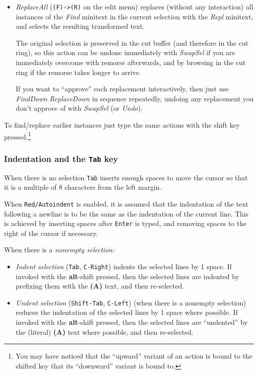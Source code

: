 \documentclass[11pt,a4paper]{article}
\begin{document}
\begin{itemize}
\item
  \emph{ReplaceAll} (\texttt{(F)-\textgreater{}(R)} on the edit menu)
  replaces (without any interaction) all instances of the \emph{Find}
  minitext in the current selection with the \emph{Repl} minitext, and
  selects the resulting transformed text.

  The original selection is preserved in the cut buffer (and therefore
  in the cut ring), so this action can be undone immediately with
  \emph{SwapSel} if you are immediately overcome with remorse
  afterwards, and by browsing in the cut ring if the remorse takes
  longer to arrive.

  If you want to ``approve'' each replacement interactively, then just
  use \emph{FindDown} \emph{ReplaceDown} in sequence repeatedly, undoing
  any replacement you don't approve of with \emph{SwapSel} (or
  \emph{Undo}).
\end{itemize}

To find/replace earlier instances just type the same actions with
the shift key pressed.\footnote{You may have noticed that the
``upward'' variant of an action is bound to the shifted key that
its ``downward'' variant is bound to.}






\hypertarget{indentation}{%
\subsubsection{Indentation and the \texttt{Tab} key}\label{indentation}}

When there is no selection \texttt{Tab} inserts enough spaces to
move the cursor so that it is a multiple of 8 characters from the left
margin.

When \texttt{Red/Autoindent} is enabled, it is assumed that the
indentation of the text following a newline is to be the same as the
indentation of the current line. This is achieved by inserting spaces
after \texttt{Enter} is typed, and removing spaces to the right of the
cursor if necessary.

When there is a \textit{nonempty selection:}

\begin{itemize}
\item
  \emph{Indent selection} (\texttt{Tab}, \texttt{C-Right}) indents the selected lines by 1
  space. If invoked with the \textbf{alt}-shift pressed, then the
  selected lines are indented by prefixing them with the \textbf{(A)}
  text, and then re-selected.
\item
  \emph{Undent selection} (\texttt{Shift-Tab}, \texttt{C-Left}) (when there is a nonempty
  selection) reduces the indentation of the selected lines by 1 space
  where possible. If invoked with the \textbf{alt}-shift pressed, then
  the selected lines are ``undented'' by the (literal) \textbf{(A)} text
  where possible, and then re-selected.
\end{itemize}
\end{document}
